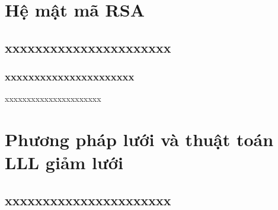 \documentclass{beamer}
\begin{document}


\section{Hệ mật mã RSA}
\subsection{xxxxxxxxxxxxxxxxxxxxxx}
\subsubsection{xxxxxxxxxxxxxxxxxxxxxx}
\begin{frame}{xxxxxxxxxxxxxxxxxxxxxx}

\end{frame}

\section{Phương pháp lưới và thuật toán LLL giảm lưới}
\subsection{xxxxxxxxxxxxxxxxxxxxxx}
\end{document}
